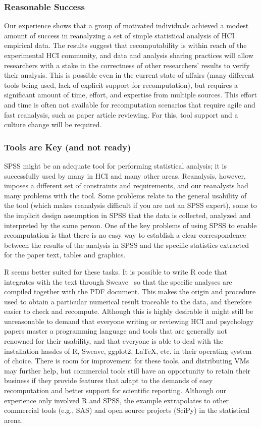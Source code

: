 \subsubsection{Reasonable Success}
Our experience shows that a group of motivated individuals achieved a modest amount of success in reanalyzing a set of simple statistical analysis of HCI empirical data. The results suggest that recomputability is within reach of the experimental HCI community, and data and analysis sharing practices will allow researchers with a stake in the correctness of other researchers' results to verify their analysis. This is possible even in the current state of affairs (many different tools being used, lack of explicit support for recomputation), but requires a significant amount of time, effort, and expertise from multiple sources. This effort and time is often not available for recomputation scenarios that require agile and fast reanalysis, such as paper article reviewing. For this, tool support and a culture change will be required. 

\subsubsection{Tools are Key (and not ready)}
SPSS might be an adequate tool for performing statistical analysis; it is successfully used by many in HCI and many other areas. Reanalysis, however, imposes a different set of constraints and requirements, and our reanalysts had many problems with the tool. Some problems relate to the general usability of the tool (which makes reanalysis difficult if you are not an SPSS expert), some to the implicit design assumption in SPSS that the data is collected, analyzed and interpreted by the same person. One of the key problems of using SPSS to enable recomputation is that there is no easy way to establish a clear correspondence between the results of the analysis in SPSS and the specific statistics extracted for the paper text, tables and graphics. 

R seems better suited for these tasks. It is possible to write R code that integrates with the text through Sweave~\cite{lmucs-papers:Leisch:2002} so that the specific analyses are compiled together with the PDF document. This makes the origin and procedure used to obtain a particular numerical result traceable to the data, and therefore easier to check and recompute. Although this is highly desirable it might still be unreasonable to demand that everyone writing or reviewing HCI and psychology papers master a programming language and tools that are generally not renowned for their usability, and that everyone is able to deal with the installation hassles of R, Sweave, ggplot2, \LaTeX, etc. in their operating system of choice. There is room for improvement for these tools, and distributing VMs may further help, but commercial tools still have an opportunity to retain their business if they provide features that adapt to the demands of easy recomputation and better support for scientific reporting. Although our experience only involved R and SPSS, the example extrapolates to other commercial tools (e.g., SAS) and open source projects (SciPy) in the statistical arena.

